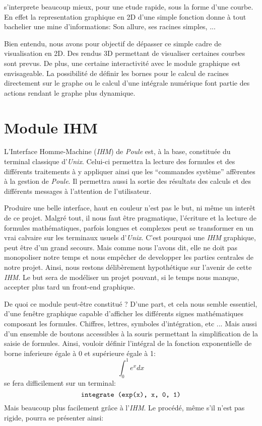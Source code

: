 \documentclass[french,12pt]{report}
\begin{document}
s'interprete  beaucoup mieux,  pour une  etude rapide,  sous  la forme
d'une courbe.  En effet la representation graphique en 2D d'une simple
fonction donne \`a tout bachelier une mine d'informations: Son allure,
ses racines simples, ...

Bien entendu, nous  avons pour objectif de d\'epasser  ce simple cadre
de  visualisation  en  2D.  Des  rendus 3D  permettant  de  visualiser
certaines courbes  sont prevus. De plus,  une certaine interactivit\'e
avec  le  module  graphique  est  envisageable.  La  possibilit\'e  de
d\'efinir  les bornes  pour le  calcul de  racines directement  sur le
graphe  ou le  calcul d'une  int\'egrale num\'erique  font  partie des
actions rendant le graphe plus dynamique.

\section{Module IHM}

L'Interface  Homme-Machine (\emph{IHM})  de \emph{Poule}  est,  \`a la
base,  constitu\'ee  du  terminal  classique  d'\emph{Unix}.  Celui-ci
permettra la lecture des  formules et des diff\'erents traitements \`a
y appliquer ainsi que  les ``commandes syst\`eme'' aff\`erentes \`a la
gestion de \emph{Poule}. Il  permettra aussi la sortie des r\'esultats
des  calculs   et  des   diff\'erents  messages  \`a   l'attention  de
l'utilisateur.

Produire une  belle interface,  haut en couleur  n'est pas le  but, ni
m\^eme un inter\^et  de ce projet. Malgr\'e tout,  il nous faut \^etre
pragmatique, l'\'ecriture  et la lecture  de formules math\'ematiques,
parfois longues et  complexes peut se transformer en  un vrai calvaire
sur les terminaux usuels  d'\emph{Unix}. C'est pourquoi une \emph{IHM}
graphique,  peut \^etre d'un  grand secours.  Mais comme  nous l'avons
dit, elle  ne doit pas monopoliser  notre temps et  nous emp\^echer de
developper les parties centrales  de notre projet. Ainsi, nous restons
d\'elib\`erement hypoth\'etique  sur l'avenir de  cette \emph{IHM}. Le
but sera  de mod\'eliser un projet  pouvant, si le  temps nous manque,
accepter plus tard un front-end graphique.

De quoi ce  module peut-\^etre constitu\'e ? D'une  part, et cela nous
semble  essentiel, d'une  fen\^etre graphique  capable  d'afficher les
diff\'erents signes math\'ematiques  composant les formules. Chiffres,
lettres, symboles d'int\'egration, etc ... Mais aussi d'un ensemble de
boutons accessibles  \`a la souris permettant la  simplification de la
saisie  de  formules.  Ainsi,  vouloir d\'efinir  l'int\'egral  de  la
fonction  exponentielle   de  borne   inferieure  \'egale  \`a   0  et
sup\'erieure \'egale \`a 1:
$$ \int_{0}^{1} e^x dx $$
se fera difficilement sur un terminal:
$$ \verb!integrate (exp(x), x, 0, 1)! $$
Mais beaucoup plus facilement gr\^ace \`a l'\emph{IHM}. Le proc\'ed\'e,
m\^eme s'il n'est pas rigide, pourra se pr\'esenter ainsi:
\end{document}
